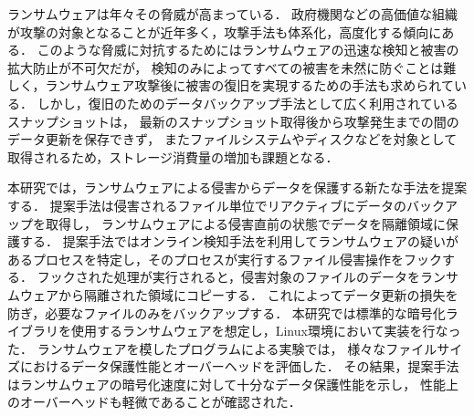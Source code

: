 ランサムウェアは年々その脅威が高まっている．
政府機関などの高価値な組織が攻撃の対象となることが近年多く，攻撃手法も体系化，高度化する傾向にある．
このような脅威に対抗するためにはランサムウェアの迅速な検知と被害の拡大防止が不可欠だが，
検知のみによってすべての被害を未然に防ぐことは難しく，ランサムウェア攻撃後に被害の復旧を実現するための手法も求められている．
しかし，復旧のためのデータバックアップ手法として広く利用されているスナップショットは，
最新のスナップショット取得後から攻撃発生までの間のデータ更新を保存できず，
またファイルシステムやディスクなどを対象として取得されるため，ストレージ消費量の増加も課題となる．

本研究では，ランサムウェアによる侵害からデータを保護する新たな手法を提案する．
提案手法は侵害されるファイル単位でリアクティブにデータのバックアップを取得し，
ランサムウェアによる侵害直前の状態でデータを隔離領域に保護する．
提案手法ではオンライン検知手法を利用してランサムウェアの疑いがあるプロセスを特定し，そのプロセスが実行するファイル侵害操作をフックする．
フックされた処理が実行されると，侵害対象のファイルのデータをランサムウェアから隔離された領域にコピーする．
これによってデータ更新の損失を防ぎ，必要なファイルのみをバックアップする．
% 
本研究では標準的な暗号化ライブラリを使用するランサムウェアを想定し，Linux環境において実装を行なった．
ランサムウェアを模したプログラムによる実験では，
様々なファイルサイズにおけるデータ保護性能とオーバーヘッドを評価した．
その結果，提案手法はランサムウェアの暗号化速度に対して十分なデータ保護性能を示し，
性能上のオーバーヘッドも軽微であることが確認された．

